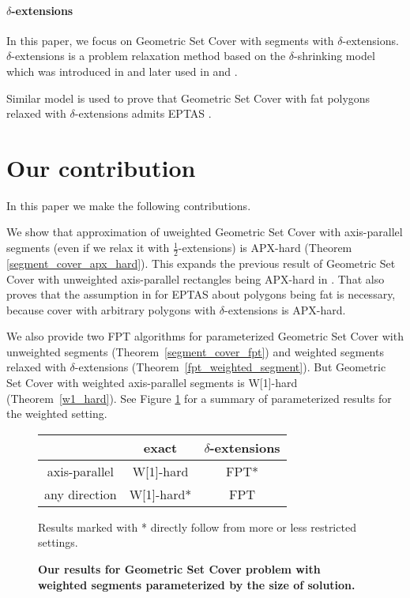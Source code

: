 \paragraph{$\delta$-extensions}
In this paper, we focus on Geometric Set Cover with segments with $\delta$-extensions.
$\delta$-extensions is a problem relaxation method based on the
$\delta$-shrinking model which was introduced in \cite{shrinking_original}
and later used in \cite{shrinking1} and \cite{shrinking2}.

Similar model is used to prove that Geometric Set Cover with fat polygons
relaxed with $\delta$-extensions admits EPTAS \cite{harpeled12}.

\section*{Our contribution}
In this paper we make the following contributions.

We show that approximation of uweighted Geometric Set Cover with axis-parallel segments
(even if we relax it with  $\frac{1}{2}$-extensions) is APX-hard
(Theorem \ref{segment_cover_apx_hard}).
This expands the previous result of Geometric Set Cover
with unweighted axis-parallel rectangles being APX-hard in \cite{rectangles_apx_hard}.
That also proves that the assumption in \cite{harpeled12}
for EPTAS about polygons being fat is necessary, because
cover with arbitrary polygons with $\delta$-extensions is APX-hard.

We also provide two FPT algorithms for parameterized Geometric Set Cover 	
with unweighted segments (Theorem~\ref{segment_cover_fpt})
and weighted segments relaxed with $\delta$-extensions
(Theorem~\ref{fpt_weighted_segment}).
But Geometric Set Cover with weighted
axis-parallel segments is W[1]-hard (Theorem~\ref{w1_hard}).
See Figure \ref{tab:weighted_fpt} for a summary of parameterized
results for the weighted setting.

\begin{figure}[h]
\begin{center}
\begin{tabular}{ | c | c | c | }
\hline
                & exact     & $\delta$-extensions \\ 
\hline                
 axis-parallel   & W[1]-hard & FPT* \\  
\hline                
 any direction   & W[1]-hard* & FPT \\
\hline                
\end{tabular}
\caption{\textbf{Our results for Geometric Set Cover problem with weighted segments 
parameterized by the size of solution.}}

Results marked with * directly follow from more or less restricted settings.
\label{tab:weighted_fpt}
\end{center}
\end{figure}


